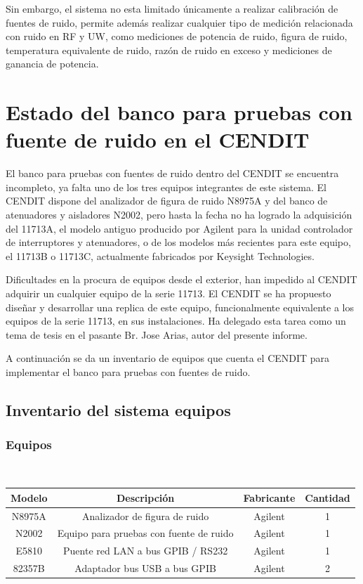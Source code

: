 	Sin embargo, el sistema no esta limitado únicamente a realizar calibración de fuentes de ruido, permite además realizar	cualquier tipo de medición relacionada con ruido en RF y UW, como mediciones de potencia de ruido, figura de ruido, temperatura equivalente de ruido, razón de ruido en exceso y mediciones de ganancia de potencia.
	
	\section{Estado del banco para pruebas con fuente de ruido en el CENDIT}
	El banco para pruebas con fuentes de ruido dentro del CENDIT se encuentra incompleto, ya falta uno de los tres equipos integrantes de este sistema. El CENDIT dispone del analizador de figura de ruido N8975A y del banco de atenuadores y aisladores N2002, pero hasta la fecha no ha logrado la adquisición del 11713A, el modelo antiguo producido por Agilent para la unidad controlador de interruptores y atenuadores, o de los modelos más recientes para este equipo, el 11713B o 11713C, actualmente fabricados por Keysight Technologies.
	
	Dificultades en la procura de equipos desde el exterior, han impedido al CENDIT adquirir un cualquier equipo de la serie 11713. El CENDIT se ha propuesto diseñar y desarrollar una replica de este equipo, funcionalmente equivalente a los equipos de la serie 11713, en sus instalaciones. Ha delegado esta tarea como un tema de tesis en el pasante Br. Jose Arias, autor del presente informe.
	
	A continuación se da un inventario de equipos que cuenta el CENDIT para implementar el banco para pruebas con fuentes de ruido.
	
	\subsection{Inventario del sistema equipos}
	
	\subsubsection{Equipos}	
		~		
		
		\begin{table}[h!]
			\centering
			
			\begin{tabular}{|c|c|c|c|}
				\hline
				 Modelo & 	Descripción &  Fabricante & Cantidad \\
				\hline
				 N8975A &	Analizador de figura de ruido &  Agilent &  1  \\
				\hline
				 N2002 	& 	Equipo para pruebas con fuente de ruido & Agilent &  1 \\ 
				\hline
				 E5810 	& 	Puente red LAN a bus GPIB / RS232 &  Agilent &  1 \\
				\hline
				 82357B &  Adaptador bus USB a bus GPIB  & Agilent &  2 \\
				\hline
				
			\end{tabular}
		\end{table}

